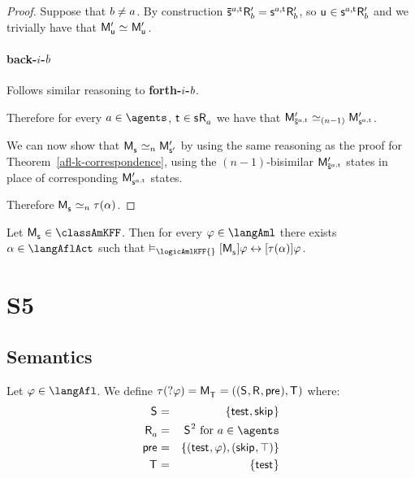 \begin{proof}
Suppose that $b \neq a$.
By construction $\aPStateS[\agentA,\aStateT] \aAccessibilityP{\agentB} = \aStateS[\agentA,\aStateT] \aAccessibilityP{\agentB}$, so $\aStateU \in \aStateS[\agentA,\aStateT] \aAccessibilityP{\agentB}$ and we trivially have that $\aPModelP{\aStateU} \bisimilar \aPModelP{\aStateU}$.

\paragraph{back-$i$-$b$} Follows similar reasoning to {\bf forth-$i$-$b$}.

Therefore for every $\agentA \in \agents$, $\aStateT \in \aStateS \aAccessibility{\agentA}$ we have that $\aPModelP{\aPStateS[\agentA,\aStateT]} \bisimilar[(n - 1)] \aPModelP{\aStateS[\agentA,\aStateT]}$.

We can now show that $\aPModel{\aStateS} \bisimilar[n] \aPModelP{\aStateSP}$ by using the same reasoning as the proof for Theorem~\ref{afl-k-correspondence}, using the $(n - 1)$-bisimilar $\aPModelP{\aPStateS[\agentA,\aStateT]}$ states in place of corresponding $\aPModelP{\aStateS[\agentA,\aStateT]}$ states.

Therefore $\aPModel{\aStateS} \bisimilar[n] \tau(\alpha)$.
\end{proof}

\begin{corollary}
Let $\aPModel{\aStateS} \in \classAmKFF$.
Then for every $\phi \in \langAml$ there exists $\alpha \in \langAflAct$ such that $\entails_\logicAmlKFF{} \actionA{\aPModel{\aStateS}} \phi \iff \actionA{\tau(\alpha)} \phi$.
\end{corollary}

\section{S5}

\subsection{Semantics}

\begin{definition}[Test]\label{afl-s-test}
Let $\phi \in \langAfl$. 
We define $\tau(\test{\phi}) = \aPModel{\aStatesT} = \aPModelTuple{\aStatesT}$ where:
\begin{eqnarray*}
    \aStates &=& \{\aStateTest, \aStateSkip\}\\
    \aAccessibility{\agentA} &=& \aStates^2 \text{ for } \agentA \in \agents\\
    \aPrecondition &=& \{(\aStateTest, \phi), (\aStateSkip, \top)\}\\
    \aStatesT &=& \{\aStateTest\}
\end{eqnarray*}
\end{definition}

